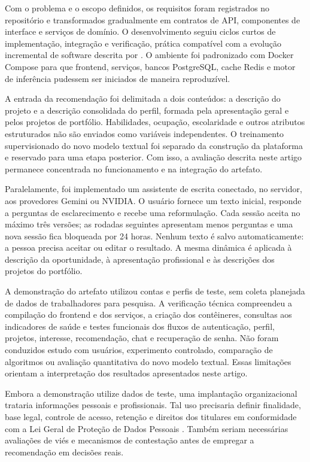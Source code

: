 \documentclass[12pt]{article}
\begin{document}
Com o problema e o escopo definidos, os requisitos foram registrados no repositório e transformados gradualmente em contratos de API, componentes de interface e serviços de domínio. O desenvolvimento seguiu ciclos curtos de implementação, integração e verificação, prática compatível com a evolução incremental de software descrita por \cite{pressman2021engenharia}. O ambiente foi padronizado com Docker Compose para que frontend, serviços, bancos PostgreSQL, cache Redis e motor de inferência pudessem ser iniciados de maneira reproduzível.

A entrada da recomendação foi delimitada a dois conteúdos: a descrição do projeto e a descrição consolidada do perfil, formada pela apresentação geral e pelos projetos de portfólio. Habilidades, ocupação, escolaridade e outros atributos estruturados não são enviados como variáveis independentes. O treinamento supervisionado do novo modelo textual foi separado da construção da plataforma e reservado para uma etapa posterior. Com isso, a avaliação descrita neste artigo permanece concentrada no funcionamento e na integração do artefato.

Paralelamente, foi implementado um assistente de escrita conectado, no servidor, aos provedores Gemini ou NVIDIA. O usuário fornece um texto inicial, responde a perguntas de esclarecimento e recebe uma reformulação. Cada sessão aceita no máximo três versões; as rodadas seguintes apresentam menos perguntas e uma nova sessão fica bloqueada por 24 horas. Nenhum texto é salvo automaticamente: a pessoa precisa aceitar ou editar o resultado. A mesma dinâmica é aplicada à descrição da oportunidade, à apresentação profissional e às descrições dos projetos do portfólio.

A demonstração do artefato utilizou contas e perfis de teste, sem coleta planejada de dados de trabalhadores para pesquisa. A verificação técnica compreendeu a compilação do frontend e dos serviços, a criação dos contêineres, consultas aos indicadores de saúde e testes funcionais dos fluxos de autenticação, perfil, projetos, interesse, recomendação, chat e recuperação de senha. Não foram conduzidos estudo com usuários, experimento controlado, comparação de algoritmos ou avaliação quantitativa do novo modelo textual. Essas limitações orientam a interpretação dos resultados apresentados neste artigo.

Embora a demonstração utilize dados de teste, uma implantação organizacional trataria informações pessoais e profissionais. Tal uso precisaria definir finalidade, base legal, controle de acesso, retenção e direitos dos titulares em conformidade com a Lei Geral de Proteção de Dados Pessoais \cite{brasil2018lgpd}. Também seriam necessárias avaliações de viés e mecanismos de contestação antes de empregar a recomendação em decisões reais.
\end{document}
